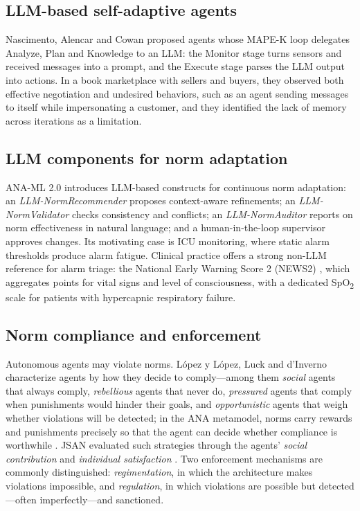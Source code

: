 \documentclass{ieeeaccess}
\begin{document}
\subsection{LLM-based self-adaptive agents}\label{sec:2.2}
Nascimento, Alencar and Cowan \cite{nascimento2023selfadaptive} proposed agents whose MAPE-K loop \cite{delemos2013roadmap,kephart2003vision} delegates Analyze, Plan and Knowledge to an LLM: the Monitor stage turns sensors and received messages into a prompt, and the Execute stage parses the LLM output into actions. In a book marketplace with sellers and buyers, they observed both effective negotiation and undesired behaviors, such as an agent sending messages to itself while impersonating a customer, and they identified the lack of memory across iterations as a limitation.

\subsection{LLM components for norm adaptation}\label{sec:2.3}
ANA-ML 2.0 \cite{viana2025anaml2} introduces LLM-based constructs for continuous norm adaptation: an \emph{LLM-NormRecommender} proposes context-aware refinements; an \emph{LLM-NormValidator} checks consistency and conflicts; an \emph{LLM-NormAuditor} reports on norm effectiveness in natural language; and a human-in-the-loop supervisor approves changes. Its motivating case is ICU monitoring, where static alarm thresholds produce alarm fatigue. Clinical practice offers a strong non-LLM reference for alarm triage: the National Early Warning Score 2 (NEWS2) \cite{rcp2017news2}, which aggregates points for vital signs and level of consciousness, with a dedicated SpO\textsubscript{2} scale for patients with hypercapnic respiratory failure.

\subsection{Norm compliance and enforcement}\label{sec:2.4}
Autonomous agents may violate norms. López y López, Luck and d'Inverno \cite{lopez2002constraining} characterize agents by how they decide to comply—among them \emph{social} agents that always comply, \emph{rebellious} agents that never do, \emph{pressured} agents that comply when punishments would hinder their goals, and \emph{opportunistic} agents that weigh whether violations will be detected; in the ANA metamodel, norms carry rewards and punishments precisely so that the agent can decide whether compliance is worthwhile \cite{viana2022creating}. JSAN evaluated such strategies through the agents' \emph{social contribution} and \emph{individual satisfaction} \cite{viana2015jsan}. Two enforcement mechanisms are commonly distinguished: \emph{regimentation}, in which the architecture makes violations impossible, and \emph{regulation}, in which violations are possible but detected—often imperfectly—and sanctioned.
\end{document}
